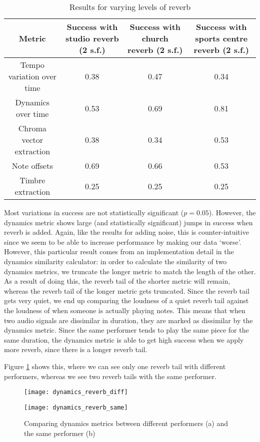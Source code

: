 \documentclass[oneside, class=book, 12pt, crop=false]{standalone}
\begin{document}
\begin{table}[h]
  \centering
  \begin{tabular}{cCCC}
    \textbf{Metric}&\textbf{Success with studio reverb} (2 s.f.)&\textbf{Success with church reverb} (2 s.f.)&\textbf{Success with sports centre reverb} (2 s.f.)\\
        \midrule[0.15em]
        Tempo variation over time & 0.38 & 0.47 &0.34\\
        Dynamics over time&0.53&0.69&0.81\\
        Chroma vector extraction&0.38&0.34&0.53\\
        Note offsets&0.69&0.66&0.53\\
        Timbre extraction&0.25&0.25&0.25\\
  \end{tabular}
  \caption{Results for varying levels of reverb}
  \label{table:reverb results}
\end{table}

Most variations in success are not statistically significant ($p=0.05$). However, the dynamics metric shows large (and statistically significant) jumps in success when reverb is added. Again, like the results for adding noise, this is counter-intuitive since we seem to be able to increase performance by making our data `worse'. However, this particular result comes from an implementation detail in the dynamics similarity calculator: in order to calculate the similarity of two dynamics metrics, we truncate the longer metric to match the length of the other. As a result of doing this, the reverb tail of the shorter metric will remain, whereas the reverb tail of the longer metric gets truncated. Since the reverb tail gets very quiet, we end up comparing the loudness of a quiet reverb tail against the loudness of when someone is actually playing notes. This means that when two audio signals are dissimilar in duration, they are marked as dissimilar by the dynamics metric. Since the same performer tends to play the same piece for the same duration, the dynamics metric is able to get high success when we apply more reverb, since there is a longer reverb tail.

Figure \ref{fig:dynamics reverb tails} shows this, where we can see only one reverb tail with different performers, whereas we see two reverb tails with the same performer.

\begin{figure}[h]

  \captionsetup{justification=centering}
  \begin{minipage}{0.5\textwidth}
    \centering
    \texttt{[image: dynamics\_reverb\_diff]}
    \subcaption{}
  \end{minipage}%
  \begin{minipage}{0.5\textwidth}
    \centering
    \texttt{[image: dynamics\_reverb\_same]}
    \subcaption{}
  \end{minipage}

  \caption{Comparing dynamics metrics between different performers (a) and the same performer (b)}
  \label{fig:dynamics reverb tails}
\end{figure}
\end{document}

